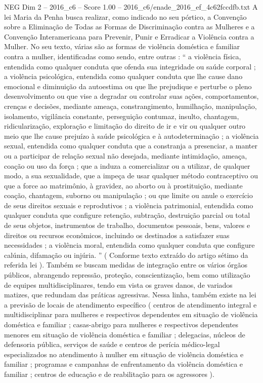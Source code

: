 \begin{textsample}{NEG Dim 2 – 2016\_c6 – Score 1.00 – 2016\_c6/enade\_2016\_ef\_4c62fccdfb.txt}
A lei Maria da Penha busca realizar, como indicado no seu pórtico, a Convenção sobre a Eliminação de Todas as Formas de Discriminação contra as Mulheres e a Convenção Interamericana para Prevenir, Punir e Erradicar a Violência contra a Mulher.
No seu texto, várias são as formas de violência doméstica e familiar contra a mulher, identificadas como sendo, entre outras : “ a violência física, entendida como qualquer conduta que ofenda sua integridade ou saúde corporal ; a violência psicológica, entendida como qualquer conduta que lhe cause dano emocional e diminuição da autoestima ou que lhe prejudique e perturbe o pleno desenvolvimento ou que vise a degradar ou controlar suas ações, comportamentos, crenças e decisões, mediante ameaça, constrangimento, humilhação, manipulação, isolamento, vigilância constante, perseguição contumaz, insulto, chantagem, ridicularização, exploração e limitação do direito de ir e vir ou qualquer outro meio que lhe cause prejuízo à saúde psicológica e à autodeterminação ; a violência sexual, entendida como qualquer conduta que a constranja a presenciar, a manter ou a participar de relação sexual não desejada, mediante intimidação, ameaça, coação ou uso da força ; que a induza a comercializar ou a utilizar, de qualquer modo, a sua sexualidade, que a impeça de usar qualquer método contraceptivo ou que a force ao matrimônio, à gravidez, ao aborto ou à prostituição, mediante coação, chantagem, suborno ou manipulação ; ou que limite ou anule o exercício de seus direitos sexuais e reprodutivos ; a violência patrimonial, entendida como qualquer conduta que configure retenção, subtração, destruição parcial ou total de seus objetos, instrumentos de trabalho, documentos pessoais, bens, valores e direitos ou recursos econômicos, incluindo os destinados a satisfazer suas necessidades ; a violência moral, entendida como qualquer conduta que configure calúnia, difamação ou injúria. ” ( Conforme texto extraído do artigo sétimo da referida lei ).
Também se buscam medidas de integração entre os vários órgãos públicos, abrangendo repressão, proteção, conscientização, bem como utilização de equipes multidisciplinares, tendo em vista os graves danos, de variados matizes, que redundam das práticas agressivas.
Nessa linha, também existe na lei a previsão de locais de atendimento específico ( centros de atendimento integral e multidisciplinar para mulheres e respectivos dependentes em situação de violência doméstica e familiar ; casas-abrigo para mulheres e respectivos dependentes menores em situação de violência doméstica e familiar ; delegacias, núcleos de defensoria pública, serviços de saúde e centros de perícia médico-legal especializados no atendimento à mulher em situação de violência doméstica e familiar ; programas e campanhas de enfrentamento da violência doméstica e familiar ; centros de educação e de reabilitação para os agressores ).

\end{textsample}
